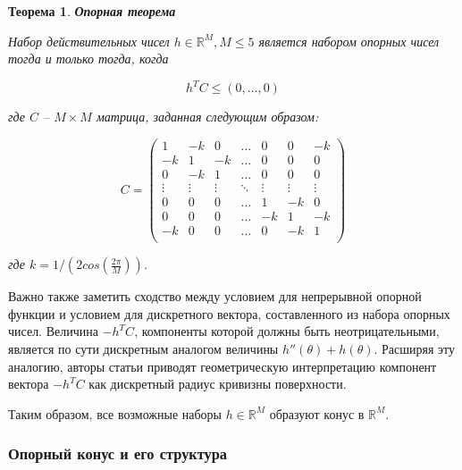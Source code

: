 \documentclass[a4paper, 12pt, titlepage]{article}
\theoremstyle{definition}
\theoremstyle{plain}
\newtheorem{SmartTheorem}{Теорема}
\theoremstyle{plain}
\begin{document}
\begin{SmartTheorem}
 \label{thm:support-vector-criterion}
 \textbf{Опорная теорема}

 Набор действительных чисел $h \in \mathbb{R}^{M}, M \leq 5$ является набором
 опорных чисел тогда и только тогда, когда

 \begin{equation}
  h^{T} C \leq (0, \ldots, 0)
 \end{equation}

 где $C$ -- $M \times M$ матрица, заданная следующим образом:

 \begin{equation}
  C = 
  \left(
  \begin{array}{ccccccc}
       1 &     -k &      0 & \ldots &      0 &      0 &     -k \\
      -k &      1 &     -k & \ldots &      0 &      0 &      0 \\
       0 &     -k &      1 & \ldots &      0 &      0 &      0 \\
  \vdots & \vdots & \vdots & \ddots & \vdots & \vdots & \vdots \\
       0 &      0 &      0 & \ldots &      1 &     -k &      0 \\
       0 &      0 &      0 & \ldots &     -k &      1 &     -k \\
      -k &      0 &      0 & \ldots &      0 &     -k &      1 \\
  \end{array}
  \right)
 \end{equation}

 где $k = 1 / (2 cos(\frac{2 \pi}{M}))$.
\end{SmartTheorem}

Важно также заметить сходство между условием для непрерывной опорной функции и
условием для дискретного вектора, составленного из набора опорных чисел.
Величина $ - h^{T} C$, компоненты которой должны быть неотрицательными, является
по сути дискретным аналогом величины $h''(\theta) + h(\theta)$. Расширяя эту
аналогию, авторы статьи приводят геометрическую интерпретацию компонент вектора
$ - h^{T} C$ как дискретный радиус кривизны поверхности.

Таким образом, все возможные наборы $h \in \mathbb{R}^{M}$ образуют конус в
$\mathbb{R}^{M}$.

\subsubsection{Опорный конус и его структура}
\label{sec:history/PrinceW90/support-cone}
\end{document}
